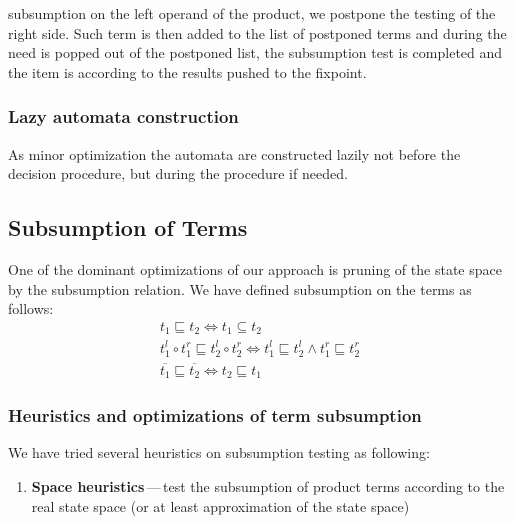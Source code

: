     subsumption on the left operand of the product, we postpone the
    testing of the right side. Such term is then added to the list
    of postponed terms and during the need is popped out of the
    postponed list, the subsumption test is completed and the
    item is according to the results pushed to the fixpoint.
    
    \subsubsection{Lazy automata construction}
    As minor optimization the automata are constructed lazily 
    not before the decision procedure, but during the procedure
    if needed.
    
  \subsection{Subsumption of Terms}\label{opt:sub}
  
  One of the dominant optimizations of our approach is pruning of the
  state space by the subsumption relation. We have defined 
  subsumption on the terms as follows:
  	\begin{eqnarray}
  	t_1 \sqsubseteq t_2 \Leftrightarrow t_1 \subseteq t_2 \\
  	t_1^l \circ t_1^r \sqsubseteq t_2^l \circ t_2^r 
  	  \Leftrightarrow t_1^l \sqsubseteq t_2^l \wedge
  	                  t_1^r \sqsubseteq t_2^r\\
    \overline{t_1} \sqsubseteq \overline{t_2} \Leftrightarrow
      t_2 \sqsubseteq t_1
	\end{eqnarray}  	  
  
    \subsubsection{Heuristics and optimizations of term subsumption}
      
	We have tried several heuristics on subsumption testing as
	following:
	\begin{enumerate}
	  \item \textbf{Space heuristics}\,---\,test the subsumption of
	  product terms according to the real state space (or at least
	  approximation of the state space)
	\end{enumerate}
	
